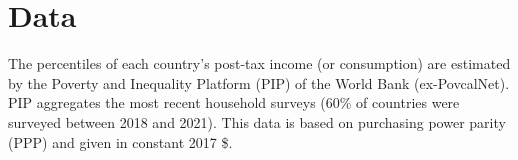 \section{Data}\label{subsec:data}
The percentiles of each country's post-tax income (or consumption) are estimated by the Poverty and Inequality Platform (PIP) of the World Bank (ex-PovcalNet). PIP aggregates the most recent household surveys (60\% of countries were surveyed between 2018 and 2021). This data is based on purchasing power parity (PPP) and given in constant 2017 \$. %

